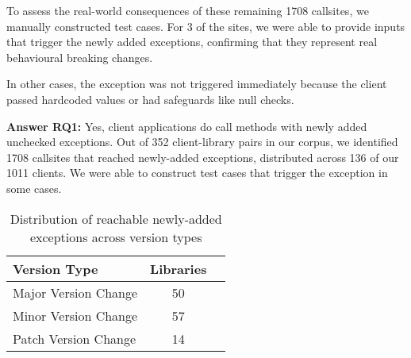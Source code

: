To assess the real-world consequences of these remaining 1708 callsites, we manually constructed test cases. For 3 of the sites, we were able to provide inputs that trigger the newly added exceptions, confirming that they represent real behavioural breaking changes.

In other cases, the exception was not triggered immediately because the client passed hardcoded values or had safeguards like null checks.

\vspace{1em}
\begin{tcolorbox}[colback=gray!10, colframe=black]
\textbf{Answer RQ1:} Yes, client applications do call methods with newly added unchecked exceptions. Out of 352 client-library pairs in our corpus, we identified 1708 callsites that reached newly-added exceptions, distributed across 136 of our 1011 clients. We were able to construct test cases that trigger the exception in some cases.
\end{tcolorbox}
\vspace{1em}

\begin{table}[h]
\centering
\caption{Distribution of reachable newly-added exceptions across version types}
\label{tab:version-distribution}
\begin{tabular}{lcc}
\toprule
\textbf{Version Type} & \textbf{Libraries} \\
\midrule
Major Version Change & 50 \\
Minor Version Change & 57 \\
Patch Version Change & 14 \\
\bottomrule
\end{tabular}
\end{table}

